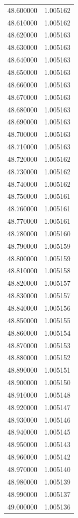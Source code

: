 \begin{tabular}{rr}
48.600000 & 1.005162 \\
48.610000 & 1.005162 \\
48.620000 & 1.005163 \\
48.630000 & 1.005163 \\
48.640000 & 1.005163 \\
48.650000 & 1.005163 \\
48.660000 & 1.005163 \\
48.670000 & 1.005163 \\
48.680000 & 1.005163 \\
48.690000 & 1.005163 \\
48.700000 & 1.005163 \\
48.710000 & 1.005163 \\
48.720000 & 1.005162 \\
48.730000 & 1.005162 \\
48.740000 & 1.005162 \\
48.750000 & 1.005161 \\
48.760000 & 1.005161 \\
48.770000 & 1.005161 \\
48.780000 & 1.005160 \\
48.790000 & 1.005159 \\
48.800000 & 1.005159 \\
48.810000 & 1.005158 \\
48.820000 & 1.005157 \\
48.830000 & 1.005157 \\
48.840000 & 1.005156 \\
48.850000 & 1.005155 \\
48.860000 & 1.005154 \\
48.870000 & 1.005153 \\
48.880000 & 1.005152 \\
48.890000 & 1.005151 \\
48.900000 & 1.005150 \\
48.910000 & 1.005148 \\
48.920000 & 1.005147 \\
48.930000 & 1.005146 \\
48.940000 & 1.005145 \\
48.950000 & 1.005143 \\
48.960000 & 1.005142 \\
48.970000 & 1.005140 \\
48.980000 & 1.005139 \\
48.990000 & 1.005137 \\
49.000000 & 1.005136 \\

\end{tabular}
